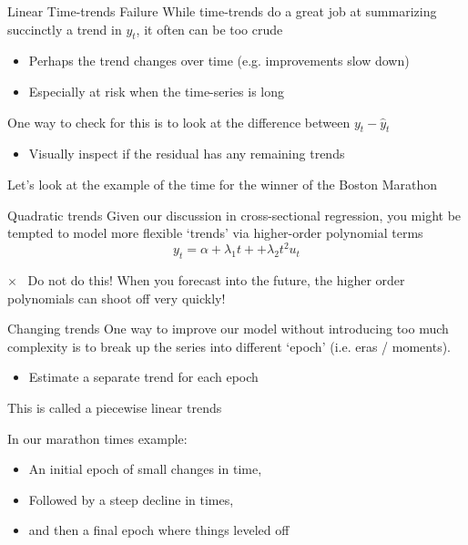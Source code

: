 \documentclass[aspectratio=169,t,11pt,table]{beamer}
\begin{document}
\begin{frame}{Linear Time-trends Failure}
  While time-trends do a great job at summarizing succinctly a trend in $y_t$, it often can be too crude

  \begin{itemize}
    \item Perhaps the trend changes over time (e.g. improvements slow down)
    
    \item Especially at risk when the time-series is long
  \end{itemize}

  \bigskip
  One way to check for this is to look at the difference between $y_t - \hat{y}_t$
  \begin{itemize}
    \item Visually inspect if the residual has any remaining trends
  \end{itemize}

  \bigskip
  Let's look at the example of the time for the winner of the Boston Marathon
\end{frame}


\begin{frame}{Quadratic trends}
  Given our discussion in cross-sectional regression, you might be tempted to model more flexible `trends' via higher-order polynomial terms
  $$
    y_t = \alpha + \lambda_1 t + + \lambda_2 t^2 u_t
  $$

  \bigskip
  \begin{tcolorbox}[boxrule = 0pt, frame hidden, sharp corners, enhanced, borderline west = {4pt}{0pt}{red}, interior hidden]
    {\color{red}\Large $\times$\ } Do not do this! When you forecast into the future, the higher order polynomials can shoot off very quickly! 
   \end{tcolorbox}
\end{frame}

\begin{frame}{Changing trends}
  One way to improve our model without introducing too much complexity is to break up the series into different `epoch' (i.e. eras / moments). 
  \begin{itemize}
    \item Estimate a separate trend for each epoch
  \end{itemize}

  \bigskip
  This is called a \alert{piecewise linear trends} 

  \bigskip
  In our marathon times example:
  \begin{itemize}
    \item An initial epoch of small changes in time,
    \item Followed by a steep decline in times, 
    \item and then a final epoch where things leveled off
  \end{itemize}
\end{frame}
\end{document}
